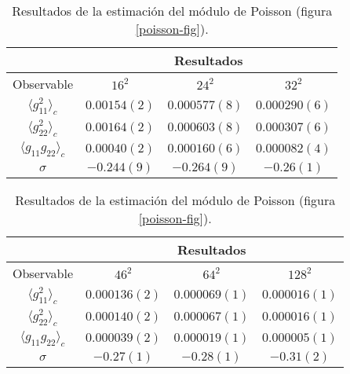 \begin{table}[h]
\centering
\begin{tabular}{|c|c|c|c|}\hline
  & \multicolumn{3}{c|}{Resultados}\\ \hline
 Observable              & $16^2$ & $24^2$ & $32^2$ \\ \hline\hline
 $\langle g_{11}^2 \rangle_c$  & $0.00154(2) $& $0.000577(8)$  & $0.000290(6)$\\ \hline
 $\langle g_{22}^2 \rangle_c$  & $0.00164(2) $&  $0.000603(8)$ & $0.000307(6)$ \\ \hline
$\langle g_{11}g_{22} \rangle_c$& $0.00040(2)$ &  $0.000160(6)$ & $0.000082(4)$\\ \hline
$\sigma$                      & $ -0.244(9)$ &  $-0.264(9)$   & $-0.26(1)$ \\ \hline
\end{tabular}\vspace{0.4cm}
\begin{tabular}{|c|c|c|c|}\hline
   & \multicolumn{3}{c|}{Resultados}\\ \hline
  Observable             & $46^2$ & $64^2$& $128^2$\\ \hline\hline
 $\langle g_{11}^2 \rangle_c$ & $0.000136(2)$& $0.000069(1)$  & $0.000016(1)$\\ \hline
 $\langle g_{22}^2 \rangle_c$ & $0.000140(2)$& $0.000067(1)$  & $0.000016(1)$    \\ \hline
$\langle g_{11}g_{22} \rangle_c$& $0.000039(2)$ & $0.000019(1)$ & $0.000005(1)$\\ \hline
$\sigma$                      & $-0.27(1)$   & $-0.28(1)$     & $-0.31(2)$\\ \hline
\end{tabular}
\caption{Resultados de la estimación del módulo de Poisson (figura \ref{poisson-fig}).}\label{poisson-tab}
\end{table}

